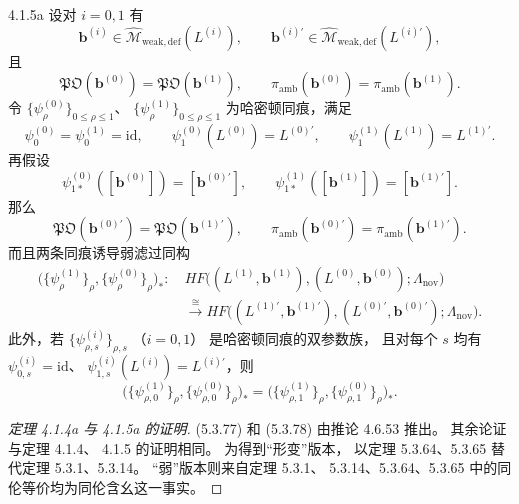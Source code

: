 \begin{theorem}{4.1.5a}\label{thm:4-1-5a}
设对 $i=0,1$ 有
\[
\boldsymbol b^{(i)}
\in\widehat{\mathcal M}_{\mathrm{weak,def}}(L^{(i)}),
\qquad
\boldsymbol b^{(i)\prime}
\in\widehat{\mathcal M}_{\mathrm{weak,def}}(L^{(i)\prime}),
\]
且
\[
\mathfrak{PO}(\boldsymbol b^{(0)})
=\mathfrak{PO}(\boldsymbol b^{(1)}),
\qquad
\pi_{\mathrm{amb}}(\boldsymbol b^{(0)})
=\pi_{\mathrm{amb}}(\boldsymbol b^{(1)}).
\]
令
$\{\psi_\rho^{(0)}\}_{0\le\rho\le1}$、
$\{\psi_\rho^{(1)}\}_{0\le\rho\le1}$
为哈密顿同痕，满足
\[
\psi_0^{(0)}=\psi_0^{(1)}=\mathrm{id},
\qquad
\psi_1^{(0)}(L^{(0)})=L^{(0)\prime},
\qquad
\psi_1^{(1)}(L^{(1)})=L^{(1)\prime}.
\]
再假设
\[
\psi_{1*}^{(0)}([\boldsymbol b^{(0)}])
=[\boldsymbol b^{(0)\prime}],
\qquad
\psi_{1*}^{(1)}([\boldsymbol b^{(1)}])
=[\boldsymbol b^{(1)\prime}].
\]
那么
\begin{equation}
\mathfrak{PO}(\boldsymbol b^{(0)\prime})
=\mathfrak{PO}(\boldsymbol b^{(1)\prime}),
\qquad
\pi_{\mathrm{amb}}(\boldsymbol b^{(0)\prime})
=\pi_{\mathrm{amb}}(\boldsymbol b^{(1)\prime}).
\tag{5.3.78}\label{eq:5-3-78}
\end{equation}
而且两条同痕诱导弱滤过同构
\[
\begin{aligned}
\bigl(
\{\psi_\rho^{(1)}\}_\rho,
\{\psi_\rho^{(0)}\}_\rho
\bigr)_*\colon\
&HF\bigl(
(L^{(1)},\boldsymbol b^{(1)}),
(L^{(0)},\boldsymbol b^{(0)});
\Lambda_{\mathrm{nov}}
\bigr)\\
&\xrightarrow{\ \cong\ }
HF\bigl(
(L^{(1)\prime},\boldsymbol b^{(1)\prime}),
(L^{(0)\prime},\boldsymbol b^{(0)\prime});
\Lambda_{\mathrm{nov}}
\bigr).
\end{aligned}
\]
此外，若
$\{\psi_{\rho,s}^{(i)}\}_{\rho,s}$
（$i=0,1$）
是哈密顿同痕的双参数族，
且对每个 $s$ 均有
$\psi_{0,s}^{(i)}=\mathrm{id}$、
$\psi_{1,s}^{(i)}(L^{(i)})
=L^{(i)\prime}$，则
\[
\bigl(
\{\psi_{\rho,0}^{(1)}\}_\rho,
\{\psi_{\rho,0}^{(0)}\}_\rho
\bigr)_*
=
\bigl(
\{\psi_{\rho,1}^{(1)}\}_\rho,
\{\psi_{\rho,1}^{(0)}\}_\rho
\bigr)_*.
\]
\end{theorem}

\begin{proof}[定理 4.1.4a 与 4.1.5a 的证明]
(5.3.77) 和 (5.3.78)
由推论 4.6.53 推出。
其余论证与定理 4.1.4、
4.1.5 的证明相同。
为得到“形变”版本，
以定理 5.3.64、5.3.65
替代定理 5.3.1、5.3.14。
“弱”版本则来自定理 5.3.1、
5.3.14、5.3.64、5.3.65
中的同伦等价均为同伦含幺这一事实。
\end{proof}


